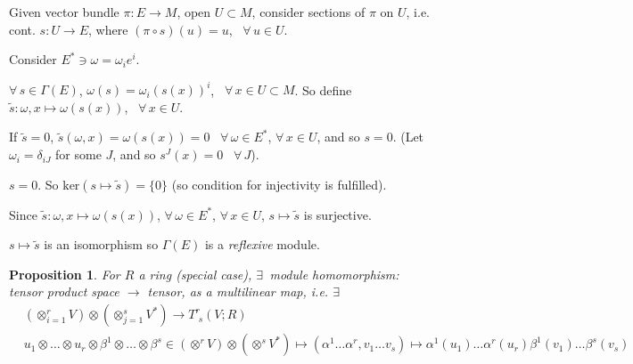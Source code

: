 \documentclass[10pt]{amsart}
\newtheorem{proposition}{Proposition}
\newcommand{\exercisehead}[1]
  { \smallskip
   \noindent{\small\bf Exercise #1.}
  }
\begin{document}
\begin{multicols*}{2}
\exercisehead{7.5} Given vector bundle $\pi: E \to M$, open $U\subset M$, consider sections of $\pi$ on $U$, i.e. cont. $s:U\to E$, where $(\pi\circ s)(u)=u$, \, $\forall \, u \in U$.  

Consider $E^* \ni \omega =\omega_i e^i$.  

$\forall \, s\in \Gamma(E)$, $\omega(s) = \omega_i(s(x))^i$, \, $\forall \, x \in U\subset M$.  So define $\widetilde{s}: \omega,x\mapsto \omega(s(x))$, \, $\forall \, x \in U$.  

If $\widetilde{s} =0$, $\widetilde{s}(\omega,x) = \omega(s(x)) =0$ \quad \, $\forall \, \omega \in E^*$, $\forall \, x\in U$, and so $s=0$.  (Let $\omega_i = \delta_{iJ}$ for some $J$, and so $s^J(x) =0$ \quad \, $\forall \, J$).  

$s=0$.  So $\text{ker}(s\mapsto \widetilde{s}) = \lbrace 0 \rbrace$ (so condition for injectivity is fulfilled).  

Since $\widetilde{s}:\omega,x\mapsto \omega(s(x))$, $\forall \, \omega \in E^*$, $\forall \, x \in U$, $s\mapsto \widetilde{s}$ is surjective.  

$s\mapsto \widetilde{s}$ is an isomorphism so $\Gamma(E)$ is a \emph{reflexive} module.  


\begin{proposition}
For $R$ a ring (special case), $\exists \, $ module homomorphism:  \\

tensor product space $\to $ tensor, as a multilinear map, i.e. $\exists$ \,  
\begin{equation}
\begin{aligned}
&	\left( \otimes_{i=1}^r V \right) \otimes \left( \otimes_{j=1}^s V^* \right) \to T^r_{ \, \, s}(V;R)   \\
& u_1 \otimes \dots \otimes u_r \otimes \beta^1 \otimes \dots \otimes \beta^s \in \left( \otimes^r V \right) \otimes \left( \otimes^s V^* \right) \mapsto (\alpha^1 \dots \alpha^r, v_1 \dots v_s) \mapsto \alpha^1(u_1) \dots \alpha^r(u_r) \beta^1(v_1) \dots \beta^s(v_s)  
\end{aligned}
\end{equation}
\end{proposition}


\end{multicols*}
\end{document}
